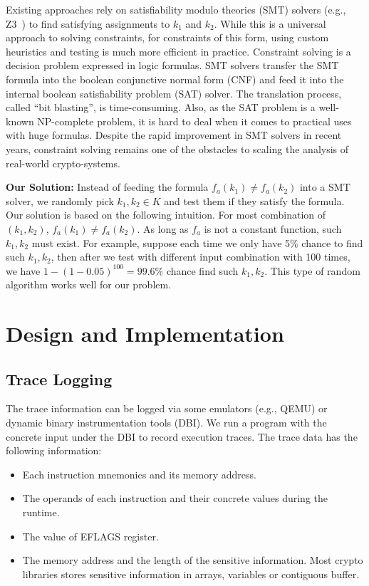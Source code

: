 Existing approaches rely on satisfiability modulo theories (SMT) solvers 
(e.g., Z3~\cite{DeMoura:2008:ZES:1792734.1792766}) to find satisfying assignments to
$k_1$ and $k_2$.
While this is a universal approach to solving constraints, 
for constraints of this form, using custom 
heuristics and testing is much more efficient in practice. Constraint 
solving is a decision problem expressed in logic formulas. SMT solvers 
transfer the SMT formula into the boolean conjunctive normal 
form (CNF) and feed it into the internal boolean satisfiability 
problem (SAT) solver. The translation process, called ``bit blasting'', 
is time-consuming. Also, as the SAT problem is a well-known NP-complete 
problem, it is hard to deal when it comes to
practical uses with huge formulas. Despite the rapid improvement 
in SMT solvers in recent years, constraint solving remains one of 
the obstacles to scaling the analysis of real-world crypto-systems.

\textbf{Our Solution:}
Instead of feeding the formula $f_a(k_1) \neq f_a(k_2)$ into a SMT solver, we
randomly pick $k_1, k_2 \in K$ and test them if they satisfy the
formula. Our solution is based on the following intuition. For most combination
of $(k_{1}, k_{2} )$, $f_a(k_1) \neq f_a(k_2)$. As long as
$f_a$ is not a constant function, such $k_1, k_2$ must exist. For example,
suppose each time we only have 5\% chance to find such $k_1, k_2$, then after we
test with different input combination with 100 times, we have $1 -
(1-0.05)^{100} = 99.6\%$ chance find such $k_1, k_2$. This type of random algorithm
works well for our problem.

\section{Design and Implementation}
\subsection{Trace Logging}
The trace information can be logged via some emulators (e.g., QEMU) or dynamic binary instrumentation tools (DBI). 
We run a program with the concrete input under the DBI to record execution traces.
The trace data has the following information:
\begin{itemize}
     \item Each instruction mnemonics and its memory address.
     \item The operands of each instruction and their concrete values during the runtime.
     \item The value of EFLAGS register. 
     \item The memory address and the length of the sensitive information.
      Most crypto libraries stores sensitive information in arrays,
      variables or contiguous buffer.
\end{itemize}

